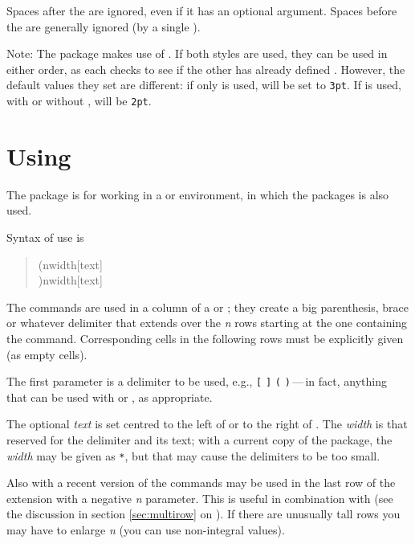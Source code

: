 \documentclass[a4paper]{article}
\begin{document}
Spaces after the  are ignored, even if it has an optional
argument.  Spaces before the  are generally ignored (by a
single \unskip).

Note: The  package makes use of .  If
both styles are used, they can be used in either order, as each checks
to see if the other has already defined .  However,
the default values they set are different: if only 
is used,  will be set to \texttt{3pt}.  If
 is used, with or without ,
 will be \texttt{2pt}.

\section{Using }

The package is for working in a  or 
environment, in which the  packages is also used.

Syntax of use is
\begin{quote}
  ({n}{width}[text]\\
  ){n}{width}[text]
\end{quote}
The commands are used in a column of a  or
; they create a big parenthesis, brace or whatever
delimiter that extends over the \emph{n} rows starting at the one
containing the command.  Corresponding cells in the following rows
must be explicitly given (as empty cells).

The first parameter is a delimiter to be used, e.g., 
 \texttt{[} \texttt{]} \texttt{(} \texttt{)}\,---\,in fact,
anything that can be used with  or , as appropriate.

The optional \emph{text} is set centred to the left of  or
to the right of .  The \emph{width} is that reserved for
the delimiter and its text; with a current copy of the
 package, the \emph{width} may be given as
\texttt{*}, but that may cause the delimiters to be too small.

Also with a recent version of  the commands may be
used in the last row of the extension with a negative \emph{n}
parameter.  This is useful in combination with  (see
the discussion in section \ref{sec:multirow} on ).
If there are unusually tall rows you may have to enlarge \emph{n} (you
can use non-integral values).
\end{document}
